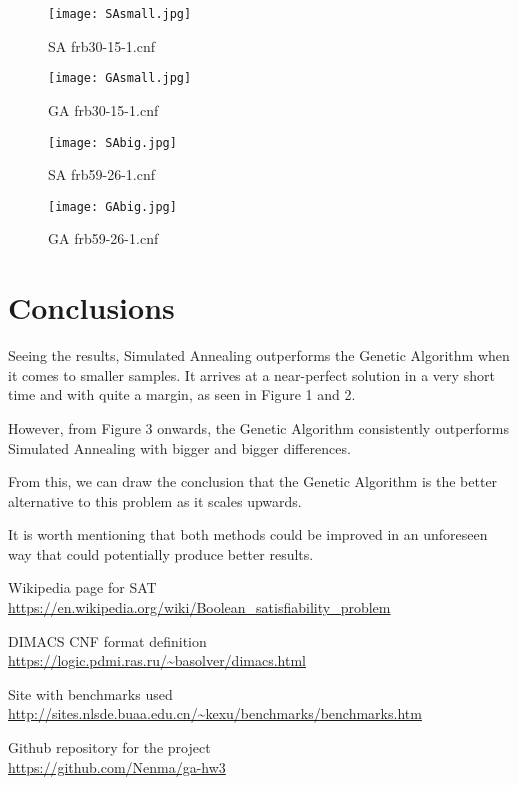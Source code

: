 \documentclass{article}
\begin{document}
\begin{figure}[!htbp]
    \texttt{[image: SAsmall.jpg]}
    \caption{SA frb30-15-1.cnf}
\end{figure}

\begin{figure}[!htbp]
    \texttt{[image: GAsmall.jpg]}
    \caption{GA frb30-15-1.cnf}
\end{figure}

\begin{figure}[!htbp]
    \texttt{[image: SAbig.jpg]}
    \caption{SA frb59-26-1.cnf}
\end{figure}

\begin{figure}[!htbp]
    \texttt{[image: GAbig.jpg]}
    \caption{GA frb59-26-1.cnf}
\end{figure}

\newpage

\section{Conclusions}
Seeing the results, Simulated Annealing outperforms the Genetic Algorithm
when it comes to smaller samples. It arrives at a near-perfect solution in
a very short time and with quite a margin, as seen in Figure 1 and 2.

However, from Figure 3 onwards, the Genetic Algorithm consistently outperforms
Simulated Annealing with bigger and bigger differences.

From this, we can draw the conclusion that the Genetic Algorithm is
the better alternative to this problem as it scales upwards.

It is worth mentioning that both methods could be improved in an unforeseen
way that could potentially produce better results.

\begin{thebibliography}{9}

    Wikipedia page for SAT \\
    \url{https://en.wikipedia.org/wiki/Boolean_satisfiability_problem}

    DIMACS CNF format definition \\
    \url{https://logic.pdmi.ras.ru/~basolver/dimacs.html}

    Site with benchmarks used \\
    \url{http://sites.nlsde.buaa.edu.cn/~kexu/benchmarks/benchmarks.htm}

    Github repository for the project \\
    \url{https://github.com/Nenma/ga-hw3}

\end{thebibliography}
\end{document}
